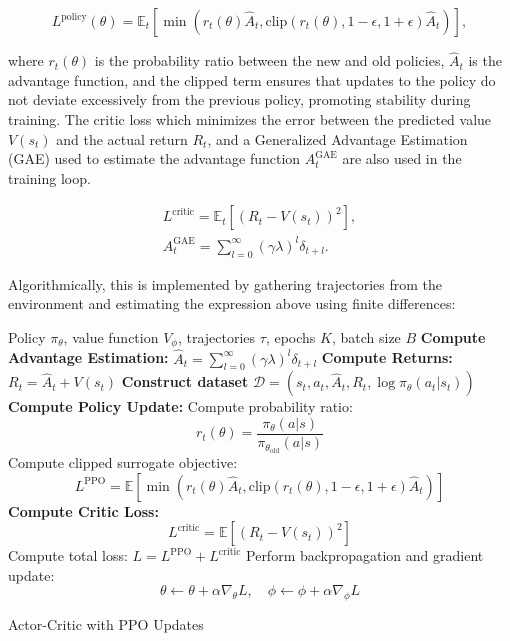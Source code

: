 \[
    L^{\text{policy}}(\theta) = \mathbb{E}_t \left[ \min \left( r_t(\theta) \hat{A}_t, \text{clip}(r_t(\theta), 1 - \epsilon, 1 + \epsilon) \hat{A}_t \right) \right],
\]

where \( r_t(\theta) \) is the probability ratio between the new and old policies, \( \hat{A}_t \) is the advantage function,
and the clipped term ensures that updates to the policy do not deviate excessively from the previous policy, promoting stability during training.
The critic loss which minimizes the error between the predicted value \( V(s_t) \) and the actual return \( R_t \),
and a Generalized Advantage Estimation (GAE) used to estimate the advantage function \( A^{\text{GAE}}_t \) are also used in the training loop.

\begin{gather*}
    L^{\text{critic}} = \mathbb{E}_t \left[ \left( R_t - V(s_t) \right)^2 \right],\\
    A^{\text{GAE}}_t = \sum_{l=0}^{\infty} (\gamma \lambda)^l \delta_{t+l}.
\end{gather*}

Algorithmically, this is implemented by gathering trajectories from the environment and estimating the expression above using finite differences:

\begin{algorithm}[H]
    \begin{algorithmic}[1]
        \Require Policy $\pi_\theta$, value function $V_\phi$, trajectories $\tau$, epochs $K$, batch size $B$
        \State \textbf{Compute Advantage Estimation:}
        \State $\hat{A}_t = \sum_{l=0}^{\infty} (\gamma \lambda)^l \delta_{t+l}$
        \State \textbf{Compute Returns:} $R_t = \hat{A}_t + V(s_t)$
        \State \textbf{Construct dataset} $\mathcal{D} = (s_t, a_t, \hat{A}_t, R_t, \log \pi_\theta(a_t | s_t))$
                \State \textbf{Compute Policy Update:}
                \State Compute probability ratio:
                \[
                    r_t(\theta) = \frac{\pi_\theta(a | s)}{\pi_{\theta_{\text{old}}}(a | s)}
                \]
                \State Compute clipped surrogate objective:
                \[
                    L^{\text{PPO}} = \mathbb{E} \left[ \min(r_t(\theta) \hat{A}_t, \text{clip}(r_t(\theta), 1 - \epsilon, 1 + \epsilon) \hat{A}_t) \right]
                \]
                \State \textbf{Compute Critic Loss:}
                \[
                    L^{\text{critic}} = \mathbb{E} \left[ (R_t - V(s_t))^2 \right]
                \]
                \State Compute total loss: $L = L^{\text{PPO}} + L^{\text{critic}}$
                \State Perform backpropagation and gradient update:
                \[
                    \theta \gets \theta + \alpha \nabla_\theta L, \quad \phi \gets \phi + \alpha \nabla_\phi L
                \]
            \EndFor
        \EndFor
    \end{algorithmic}
    \caption{Actor-Critic with PPO Updates}
    \label{alg:ppo}
\end{algorithm}

